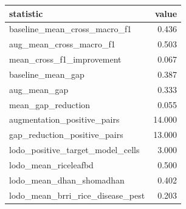 \begin{tabular}{lr}
\toprule
statistic & value \\
\midrule
baseline_mean_cross_macro_f1 & 0.436 \\
aug_mean_cross_macro_f1 & 0.503 \\
mean_cross_f1_improvement & 0.067 \\
baseline_mean_gap & 0.387 \\
aug_mean_gap & 0.333 \\
mean_gap_reduction & 0.055 \\
augmentation_positive_pairs & 14.000 \\
gap_reduction_positive_pairs & 13.000 \\
lodo_positive_target_model_cells & 3.000 \\
lodo_mean_riceleafbd & 0.500 \\
lodo_mean_dhan_shomadhan & 0.402 \\
lodo_mean_brri_rice_disease_pest & 0.203 \\
\bottomrule
\end{tabular}
